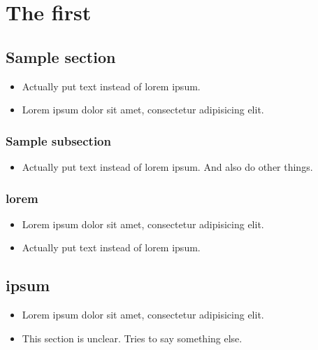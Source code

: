 \chapter{The first}
\label{autosec:0}
\vspace{-36pt}\hspace{11pt}
\section{Sample section}
\label{autosec:1}
    \begin{itemize}[noitemsep]
        \item {\color{red}Actually put text instead of lorem ipsum.}
        \item Lorem ipsum dolor sit amet, consectetur adipisicing elit.
    \end{itemize}
\subsection{Sample subsection}
\label{autosec:2}
    \begin{itemize}[noitemsep]
        \item {\color{red}Actually put text instead of lorem ipsum.}
{\color{red}And also do other things.}
    \end{itemize}
\subsection{lorem}
\label{autosec:3}
    \begin{itemize}[noitemsep]
        \item Lorem ipsum dolor sit amet, consectetur adipisicing elit.
        \item {\color{red}Actually put text instead of lorem ipsum.}
    \end{itemize}
\section{ipsum}
\label{autosec:4}
    \begin{itemize}[noitemsep]
        \item Lorem ipsum dolor sit amet, consectetur adipisicing elit.
        \item {\color{OliveGreen}This section is unclear.}
{\color{OliveGreen}Tries to say something else.}
    \end{itemize}
